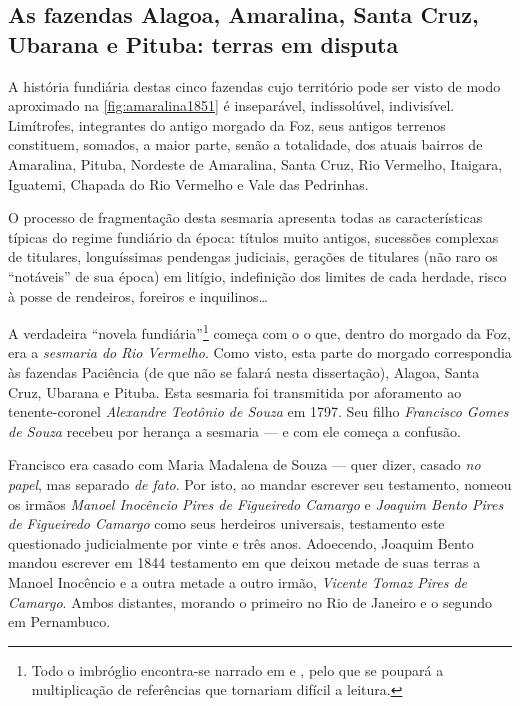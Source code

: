 \subsection{As fazendas Alagoa, Amaralina, Santa Cruz, Ubarana e Pituba: terras em disputa}\label{subsec:alagoaamaralina}

A história fundiária destas cinco fazendas cujo território pode ser visto de modo aproximado na \autoref{fig:amaralina1851} é inseparável, indissolúvel, indivisível. Limítrofes, integrantes do antigo morgado da Foz, seus antigos terrenos constituem, somados, a maior parte, senão a totalidade, dos atuais bairros de Amaralina, Pituba, Nordeste de Amaralina, Santa Cruz, Rio Vermelho, Itaigara, Iguatemi, Chapada do Rio Vermelho e Vale das Pedrinhas.

O processo de fragmentação desta sesmaria apresenta todas as características típicas do regime fundiário da época: títulos muito antigos, sucessões complexas de titulares, longuíssimas pendengas judiciais, gerações de titulares (não raro os ``notáveis'' de sua época) em litígio, indefinição dos limites de cada herdade, risco à posse de rendeiros, foreiros e inquilinos\dots 

A verdadeira ``novela fundiária''\footnote{Todo o imbróglio encontra-se narrado em  e , pelo que se poupará a multiplicação de referências que tornariam difícil a leitura.} começa com o o que, dentro do morgado da Foz, era a \textit{sesmaria do Rio Vermelho}. Como visto, esta parte do morgado correspondia às fazendas Paciência (de que não se falará nesta dissertação), Alagoa, Santa Cruz, Ubarana e Pituba. Esta sesmaria foi transmitida por aforamento ao tenente-coronel \textit{Alexandre Teotônio de Souza} em 1797. Seu filho \textit{Francisco Gomes de Souza} recebeu por herança a sesmaria --- e com ele começa a confusão.

Francisco era casado com Maria Madalena de Souza --- quer dizer, casado \textit{no papel}, mas separado \textit{de fato}. Por isto, ao mandar escrever seu testamento, nomeou os irmãos \textit{Manoel Inocêncio Pires de Figueiredo Camargo} e \textit{Joaquim Bento Pires de Figueiredo Camargo} como seus herdeiros universais, testamento este questionado judicialmente por vinte e três anos. Adoecendo, Joaquim Bento mandou escrever em 1844 testamento em que deixou metade de suas terras a Manoel Inocêncio e a outra metade a outro irmão, \textit{Vicente Tomaz Pires de Camargo}. Ambos distantes, morando o primeiro no Rio de Janeiro e o segundo em Pernambuco.

